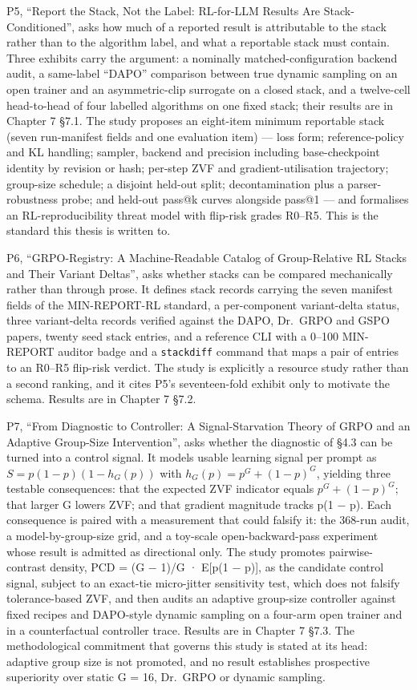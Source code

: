 \documentclass[12pt,a4paper]{report}
\begin{document}
P5, ``Report the Stack, Not the Label: RL-for-LLM Results Are
Stack-Conditioned'', asks how much of a reported result is attributable
to the stack rather than to the algorithm label, and what a reportable
stack must contain. Three exhibits carry the argument: a nominally
matched-configuration backend audit, a same-label ``DAPO'' comparison
between true dynamic sampling on an open trainer and an asymmetric-clip
surrogate on a closed stack, and a twelve-cell head-to-head of four
labelled algorithms on one fixed stack; their results are in Chapter 7
§7.1. The study proposes an eight-item minimum reportable stack (seven
run-manifest fields and one evaluation item) --- loss form;
reference-policy and KL handling; sampler, backend and precision
including base-checkpoint identity by revision or hash; per-step ZVF and
gradient-utilisation trajectory; group-size schedule; a disjoint
held-out split; decontamination plus a parser-robustness probe; and
held-out pass@k curves alongside pass@1 --- and formalises an
RL-reproducibility threat model with flip-risk grades R0--R5. This is
the standard this thesis is written to.

P6, ``GRPO-Registry: A Machine-Readable Catalog of Group-Relative RL
Stacks and Their Variant Deltas'', asks whether stacks can be compared
mechanically rather than through prose. It defines stack records
carrying the seven manifest fields of the MIN-REPORT-RL standard, a
per-component variant-delta status, three variant-delta records verified
against the DAPO, Dr.~GRPO and GSPO papers, twenty seed stack entries,
and a reference CLI with a 0--100 MIN-REPORT auditor badge and a
\texttt{stackdiff} command that maps a pair of entries to an R0--R5
flip-risk verdict. The study is explicitly a resource study rather than
a second ranking, and it cites P5's seventeen-fold exhibit only to
motivate the schema. Results are in Chapter 7 §7.2.

P7, ``From Diagnostic to Controller: A Signal-Starvation Theory of GRPO
and an Adaptive Group-Size Intervention'', asks whether the diagnostic
of §4.3 can be turned into a control signal. It models usable learning
signal per prompt as \(S = p(1-p)(1-h_G(p))\) with
\(h_G(p) = p^G + (1-p)^G\), yielding three testable consequences: that
the expected ZVF indicator equals \(p^G + (1-p)^G\); that larger G
lowers ZVF; and that gradient magnitude tracks p(1 − p). Each
consequence is paired with a measurement that could falsify it: the
368-run audit, a model-by-group-size grid, and a toy-scale
open-backward-pass experiment whose result is admitted as directional
only. The study promotes pairwise-contrast density, PCD = (G − 1)/G ·
E{[}p(1 − p){]}, as the candidate control signal, subject to an
exact-tie micro-jitter sensitivity test, which does not falsify
tolerance-based ZVF, and then audits an adaptive group-size controller
against fixed recipes and DAPO-style dynamic sampling on a four-arm open
trainer and in a counterfactual controller trace. Results are in Chapter
7 §7.3. The methodological commitment that governs this study is stated
at its head: adaptive group size is not promoted, and no result
establishes prospective superiority over static G = 16, Dr.~GRPO or
dynamic sampling.
\end{document}
